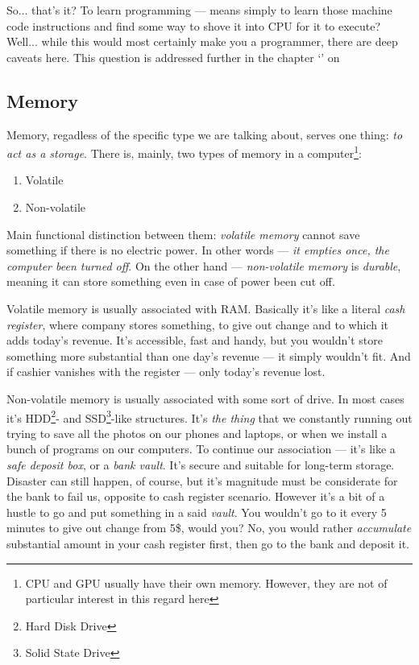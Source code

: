 \documentclass[../../what-is-computer.tex]{subfiles}
\begin{document}
        So... that's it? To learn programming --- means simply to learn those machine code instructions and find some way to shove it into CPU for it to execute?
        Well... while this would most certainly make you a programmer, there are deep caveats here.
        This question is addressed further in the chapter `' on~\pageref{chapter:why-computer}

    \subsection{Memory}\label{subsection:memory}
        Memory, regadless of the specific type we are talking about, serves one thing: \emph{to act as a storage}. There is, mainly, two types of memory in a 
        computer\footnote{CPU and GPU usually have their own memory. However, they are not of particular interest in this regard here}: \par
        
        \begin{enumerate}
            \item Volatile
            \item Non-volatile
        \end{enumerate}
        
        Main functional distinction between them: \emph{volatile memory} cannot save something if there is no electric power. In other words --- \emph{it empties once, the computer
        been turned off}. On the other hand --- \emph{non-volatile memory} is \emph{durable}, meaning it can store something even in case of power been cut off. \par

        Volatile memory is usually associated with RAM. Basically it's like a literal \emph{cash register}, where company stores something, to give
        out change and to which it adds today's revenue. It's accessible, fast and handy, but you wouldn't store something more substantial than one day's revenue ---
        it simply wouldn't fit. And if cashier vanishes with the register --- only today's revenue lost. \par

        Non-volatile memory is usually associated with some sort of drive. In most cases it's HDD\footnote{Hard Disk Drive}- and SSD\footnote{Solid State Drive}-like structures.
        It's \emph{the thing} that we constantly running out trying to save all the photos on our phones and laptops, or when we install a bunch of programs on our computers.
        To continue our association --- it's like a \emph{safe deposit box}, or a \emph{bank vault}. It's secure and suitable for long-term storage. Disaster can still happen,
        of course, but it's magnitude must be considerate for the bank to fail us, opposite to cash register scenario. However it's a bit of a hustle to go and put something 
        in a said \emph{vault}. You wouldn't go to it every 5 minutes to give out change from 5\$, would you? No, you would rather \emph{accumulate} substantial amount
        in your cash register first, then go to the bank and deposit it. \par
\end{document}
